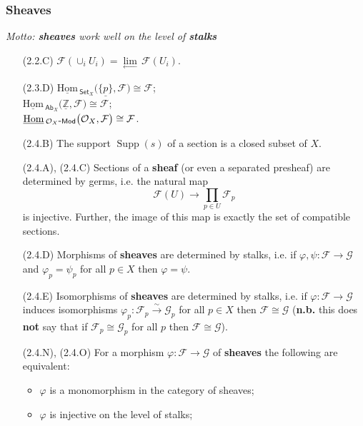 \documentclass[10pt]{article}
\DeclareMathOperator{\Supp}{Supp}
\newcommand{\invlim}[1]{\underset{#1}{\lim\limits_{\longleftarrow}}\,}
\newcommand{\Set}{\mathsf{Set}}
\newcommand{\Ab}{\mathsf{Ab}}
\newcommand{\Mod}[1]{{#1}\hbox{-}\mathsf{Mod}}
\newcommand{\fsheaf}{\mathcal{F}}
\newcommand{\gsheaf}{\mathcal{G}}
\renewcommand{\O}{\mathcal{O}}
\newcommand{\Z}{\mathbb{Z}}
\newcommand{\sHom}{\underline{\mathrm{Hom}}\,}
\newcommand{\congto}{\xrightarrow{\sim}}
\begin{document}
            \subsubsection{Sheaves}
            
                \textit{Motto: \textbf{sheaves} work well on the level of \textbf{stalks}}
        
                \begin{itemize}
                    \item[(2.2.C)] $\fsheaf(\cup_i U_i) = \invlim{}\fsheaf(U_i)$.
                    \vspace{-1em}
                    \item[(2.3.D)] $\sHom_{\Set_X}\big(\underline{\{p\}},\fsheaf\big)\cong\fsheaf$;\\
                        $\sHom_{\Ab_X}\big(\underline{\Z},\fsheaf\big)\cong\fsheaf$;\\
                        $\sHom_{\Mod{\O_X}}\big(\O_X,\fsheaf\big)\cong\fsheaf$.
                    \item[(2.4.B)] The support $\Supp(s)$ of a section is a closed subset of $X$.
                    \item[(2.4.A), (2.4.C)] Sections of a \textbf{sheaf} (or even a separated presheaf) are determined by germs, i.e. the natural map \[\fsheaf(U)\longrightarrow\prod_{p\in U}\fsheaf_p\] is injective.
                        Further, the image of this map is exactly the set of compatible sections.
                    \item[(2.4.D)] Morphisms of \textbf{sheaves} are determined by stalks, i.e. if $\varphi,\psi\colon\fsheaf\to\gsheaf$ and $\varphi_p=\psi_p$ for all $p\in X$ then $\varphi=\psi$.
                    \item[(2.4.E)] Isomorphisms of \textbf{sheaves} are determined by stalks, i.e. if $\varphi\colon\fsheaf\to\gsheaf$ induces isomorphisms $\varphi_p\colon\fsheaf_p\congto\gsheaf_p$ for all $p\in X$ then $\fsheaf\cong\gsheaf$ (\textbf{n.b.} this does \textbf{not} say that if $\fsheaf_p\cong\gsheaf_p$ for all $p$ then $\fsheaf\cong\gsheaf$).
                    \item[(2.4.N), (2.4.O)] For a morphism $\varphi\colon\fsheaf\to\gsheaf$ of \textbf{sheaves} the following are equivalent:
                        \begin{itemize}
                            \item $\varphi$ is a monomorphism in the category of sheaves;
                            \item $\varphi$ is injective on the level of stalks;

\end{itemize}
\end{itemize}
\end{document}
